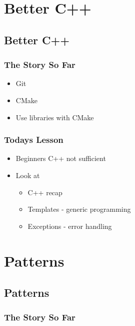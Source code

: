 \section{Better C++}\label{better-c}

\subsection{Better C++}\label{better-c-1}

\subsubsection{The Story So Far}\label{the-story-so-far}

\begin{itemize}
\itemsep1pt\parskip0pt
\item
  Git
\item
  CMake
\item
  Use libraries with CMake
\end{itemize}

\subsubsection{Todays Lesson}\label{todays-lesson}

\begin{itemize}
\itemsep1pt\parskip0pt
\item
  Beginners C++ not sufficient
\item
  Look at

  \begin{itemize}
  \itemsep1pt\parskip0pt
  \item
    C++ recap
  \item
    Templates - generic programming
  \item
    Exceptions - error handling
  \end{itemize}
\end{itemize}

\section{Patterns}\label{patterns}

\subsection{Patterns}\label{patterns-1}

\subsubsection{The Story So Far}\label{the-story-so-far-1}

